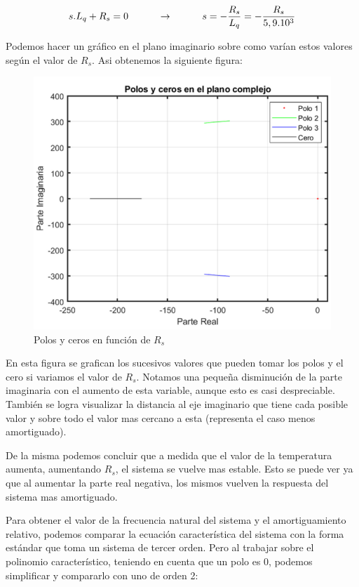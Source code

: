 \documentclass{article}
\begin{document}
\begin{equation*}
    s.L_q+ R_s = 0 \quad\quad\quad\to\quad\quad\quad s = - \frac{R_s}{L_q} = - \frac{R_s}{5,9.10^3}\\ 
\end{equation*}

Podemos hacer un gráfico en el plano imaginario sobre como varían estos valores según el valor de 
$R_s$. Asi obtenemos la siguiente figura:

\begin{figure}[H]
    \centering
    \includegraphics{polosyceros.png}
    \caption{Polos y ceros en función de $R_s$}
\end{figure}

En esta figura se grafican los sucesivos valores que pueden tomar los polos y el cero si variamos el 
valor de $R_s$. Notamos una pequeña disminución de la parte imaginaria con el aumento de esta variable, 
aunque esto es casi despreciable. También se logra visualizar la distancia al eje imaginario que 
tiene cada posible valor y sobre todo el valor mas cercano a esta (representa el caso menos 
amortiguado).

De la misma podemos concluir que a medida que el valor de la temperatura aumenta, aumentando $R_s$, el 
sistema se vuelve mas estable. Esto se puede ver ya que al aumentar la parte real negativa, los 
mismos vuelven la respuesta del sistema mas amortiguado.

Para obtener el valor de la frecuencia natural del sistema y el amortiguamiento relativo, podemos 
comparar la ecuación característica del sistema con la forma estándar que toma un sistema de tercer 
orden. Pero al trabajar sobre el polinomio característico, teniendo en cuenta que un polo es 0, 
podemos simplificar y compararlo con uno de orden 2:
\end{document}
